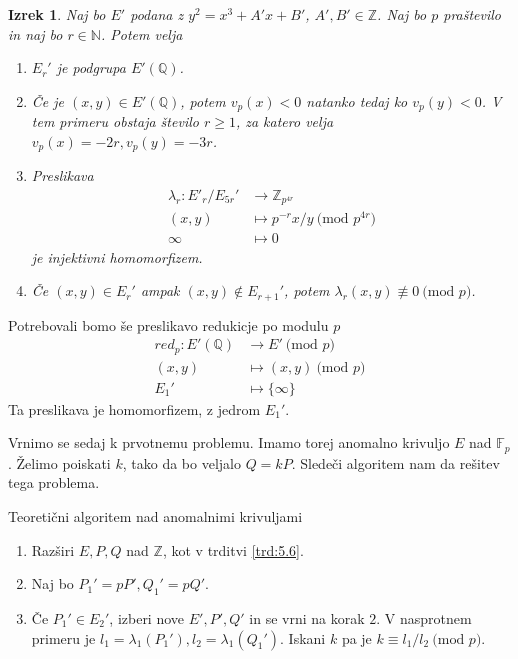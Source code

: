 \documentclass[12pt,a4paper,twoside]{article}
\theoremstyle{definition} %
\theoremstyle{plain} %
\newtheorem{izrek}[definicija]{Izrek}
\numberwithin{equation}{section}  %
\newcommand{\N}{\mathbb N}
\newcommand{\Z}{\mathbb Z}
\newcommand{\Q}{\mathbb Q}
\newcommand{\F}{\mathbb F}
\newcommand{\MOD}[1]{\ \text{(mod }{#1}\text{)}}
\begin{document}
\begin{izrek}

Naj bo $E'$ podana z $y^2 = x^3+A'x+B'$, $A',B' \in \Z$. Naj bo $p$ praštevilo in naj bo $r \in \N$. Potem velja
\begin{enumerate}

\item $E_r'$ je podgrupa $E'(\Q)$.
\item Če je $(x,y) \in E'(\Q)$, potem $v_p(x)<0$ natanko tedaj ko $v_p(y) <0$. V tem primeru obstaja število $r \geq 1$, za katero velja $v_p(x) = -2r, v_p(y) = -3r$.
\item Preslikava
\begin{align}
\lambda_r: E'_r/E_{5r}' &{}\rightarrow \Z_{p^{4r}} \nonumber \\
(x,y) &{}\mapsto p^{-r}x/y \MOD{p^{4r}} \nonumber \\
\infty &{}\mapsto 0 \nonumber
\end{align}
je injektivni homomorfizem.
\item Če $(x,y) \in E_r'$ ampak $(x,y) \not \in E_{r+1}'$, potem $\lambda_r(x,y) \not \equiv 0 \MOD{p}$.

\end{enumerate}
\end{izrek}

Potrebovali bomo še preslikavo redukicje po modulu $p$
\begin{align}
red_p: E'(\Q) &{}\rightarrow E' \MOD{p} \nonumber \\
(x,y) &{}\mapsto (x,y) \MOD{p} \nonumber \\
E_1' &{}\mapsto \{ \infty \} \nonumber
\end{align}
Ta preslikava je homomorfizem, z jedrom $E_1'$.

Vrnimo se sedaj k prvotnemu problemu. Imamo torej anomalno krivuljo $E$ nad $\F_p$. Želimo poiskati $k$, tako da bo veljalo $Q = kP$. Sledeči algoritem nam da rešitev tega problema.

\begin{algorithm}[H]
\caption[AN]{Teoretični algoritem nad anomalnimi krivuljami}
\label{alg:Anomal}
\begin{enumerate}
\item Razširi $E,P,Q$ nad $\Z$, kot v trditvi \ref{trd:5.6}.
\item Naj bo $P_1' = pP',Q_1' = pQ'$.
\item Če $P_1' \in E_2'$, izberi nove $E',P',Q'$ in se vrni na korak $2$. V nasprotnem primeru je $l_1 = \lambda_1(P_1'),l_2 = \lambda_1(Q_1')$. Iskani $k$ pa je $k \equiv l_1/l_2 \MOD{p}$.
\end{enumerate}

\end{algorithm}
\end{document}
